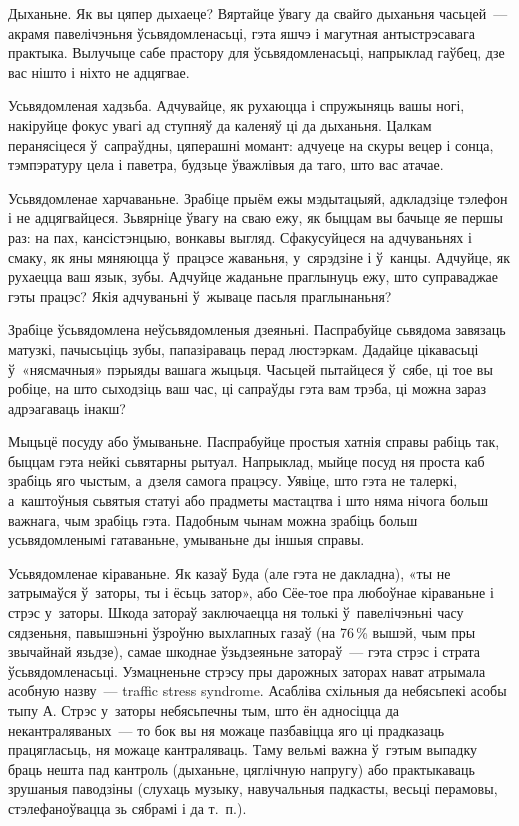 Дыханьне. Як вы цяпер дыхаеце? Вяртайце ўвагу да свайго дыханьня часьцей~--- акрамя павелічэньня ўсьвядомленасьці, гэта яшчэ і магутная антыстрэсавага практыка. Вылучыце сабе прастору для ўсьвядомленасьці, напрыклад гаўбец, дзе вас нішто і ніхто не адцягвае.

Усьвядомленая хадзьба. Адчувайце, як рухаюцца і спружыняць вашы ногі, накіруйце фокус увагі ад ступняў да каленяў ці да дыханьня. Цалкам перанясіцеся ў~сапраўдны, цяперашні момант: адчуеце на скуры вецер і сонца, тэмпэратуру цела і паветра, будзьце ўважлівыя да таго, што вас атачае.

Усьвядомленае харчаваньне. Зрабіце прыём ежы мэдытацыяй, адкладзіце тэлефон і не адцягвайцеся. Зьвярніце ўвагу на сваю ежу, як быццам вы бачыце яе першы раз: на пах, кансістэнцыю, вонкавы выгляд. Сфакусуйцеся на адчуваньнях і смаку, як яны мяняюцца ў~працэсе жаваньня, у~сярэдзіне і ў~канцы. Адчуйце, як рухаецца ваш язык, зубы. Адчуйце жаданьне праглынуць ежу, што суправаджае гэты працэс? Якія адчуваньні ў~жываце пасьля праглынаньня?

Зрабіце ўсьвядомлена неўсьвядомленыя дзеяньні. Паспрабуйце сьвядома завязаць матузкі, пачысьціць зубы, папазіраваць перад люстэркам. Дадайце цікавасьці ў~«нясмачныя» пэрыяды вашага жыцьця. Часьцей пытайцеся ў~сябе, ці тое вы робіце, на што сыходзіць ваш час, ці сапраўды гэта вам трэба, ці можна зараз адрэагаваць інакш?

Мыцьцё посуду або ўмываньне. Паспрабуйце простыя хатнія справы рабіць так, быццам гэта нейкі сьвятарны рытуал. Напрыклад, мыйце посуд ня проста каб зрабіць яго чыстым, а~дзеля самога працэсу. Уявіце, што гэта не талеркі, а~каштоўныя сьвятыя статуі або прадметы мастацтва і што няма нічога больш важнага, чым зрабіць гэта. Падобным чынам можна зрабіць больш усьвядомленымі гатаваньне, умываньне ды іншыя справы.

Усьвядомленае кіраваньне. Як казаў Буда (але гэта не дакладна), «ты не затрымаўся ў~заторы, ты і ёсьць затор», або Сёе-тое пра любоўнае кіраваньне і стрэс у~заторы. Шкода затораў заключаецца ня толькі ў~павелічэньні часу сядзеньня, павышэньні ўзроўню выхлапных газаў (на 76\,\% вышэй, чым пры звычайнай язьдзе), самае шкоднае ўзьдзеяньне затораў~--- гэта стрэс і страта ўсьвядомленасьці. Узмацненьне стрэсу пры дарожных заторах нават атрымала асобную назву~--- traffic stress syndrome. Асабліва схільныя да небясьпекі асобы тыпу А. Стрэс у~заторы небясьпечны тым, што ён адносіцца да некантраляваных~--- то бок вы ня можаце пазбавіцца яго ці прадказаць працягласьць, ня можаце кантраляваць. Таму вельмі важна ў~гэтым выпадку браць нешта пад кантроль (дыханьне, цяглічную напругу) або практыкаваць зрушаныя паводзіны (слухаць музыку, навучальныя падкасты, весьці перамовы, стэлефаноўвацца зь сябрамі і да т.~п.).

